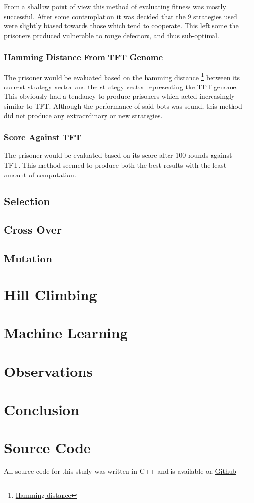 \documentclass[12pt]{article}
\begin{document}
From a shallow point of view this method of evaluating fitness was mostly
successful.  After some contemplation it was decided that the
9 strategies used were slightly biased towards those which tend to cooperate. 
This left some the prisoners produced vulnerable to rouge defectors,
and thus sub-optimal.

\subsubsection{Hamming Distance From TFT Genome}
The prisoner would be evaluated based on the hamming distance
\footnote
{\href{https://en.wikipedia.org/wiki/Hamming_distance}{Hamming distance}}
between its current strategy vector and the strategy vector representing 
the TFT genome.  This obviously had a tendancy to produce prisoners which
acted increasingly similar to TFT.  Although the performance of said bots
was sound, this method did not produce any extraordinary or new strategies.

\subsubsection{Score Against TFT}

The prisoner would be evaluated based on its score after 100 rounds against
TFT.  This method seemed to produce both the best results with the least
amount of computation.

\subsection{Selection}
\subsection{Cross Over}
\subsection{Mutation}



\pagebreak

\section{Hill Climbing}

\pagebreak

\section{Machine Learning}

\pagebreak

\section{Observations}
\label{observations}

\pagebreak

\section{Conclusion}

\pagebreak

\section{Source Code}
All source code for this study was written in C++ and is
available on
\href{https://github.com/Quinny/IteratedPrisoners}{Github}
\end{document}
